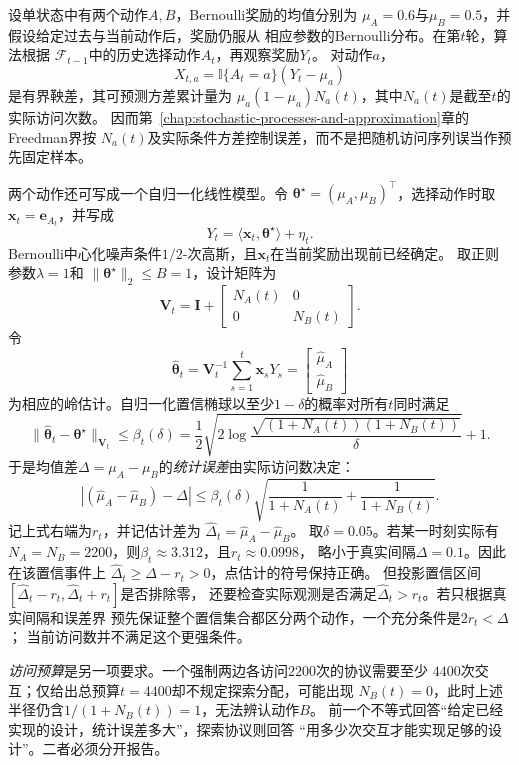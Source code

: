 \begin{example}[自适应两动作探索中的置信与访问预算]
  \label{ex:future-two-action-exploration-budget}
  设单状态中有两个动作\(A,B\)，Bernoulli奖励的均值分别为
  \(\mu_A=0.6\)与\(\mu_B=0.5\)，并假设给定过去与当前动作后，奖励仍服从
  相应参数的Bernoulli分布。在第\(t\)轮，算法根据
  \(\mathcal F_{t-1}\)中的历史选择动作\(A_t\)，再观察奖励\(Y_t\)。
  对动作\(a\)，
  \[
    X_{t,a}
    =
    \mathbb{I}\{A_t=a\}(Y_t-\mu_a)
  \]
  是有界鞅差，其可预测方差累计量为
  \(\mu_a(1-\mu_a)N_a(t)\)，其中\(N_a(t)\)是截至\(t\)的实际访问次数。
  因而第~\ref{chap:stochastic-processes-and-approximation}章的Freedman界按
  \(N_a(t)\)及实际条件方差控制误差，而不是把随机访问序列误当作预先固定样本。

  两个动作还可写成一个自归一化线性模型。令
  \(\bm\theta^\star=(\mu_A,\mu_B)^{\top}\)，选择动作时取
  \(\bm x_t=\bm e_{A_t}\)，并写成
  \[
    Y_t
    =
    \langle\bm x_t,\bm\theta^\star\rangle+\eta_t.
  \]
  Bernoulli中心化噪声条件\(1/2\)-次高斯，且\(\bm x_t\)在当前奖励出现前已经确定。
  取正则参数\(\lambda=1\)和
  \(\lVert\bm\theta^\star\rVert_2\leq B=1\)，设计矩阵为
  \[
    \bm V_t
    =
    \bm I+
    \begin{bmatrix}
      N_A(t)&0\\
      0&N_B(t)
    \end{bmatrix}.
  \]
  令
  \[
    \widehat{\bm\theta}_t
    =
    \bm V_t^{-1}
    \sum_{s=1}^{t}\bm x_sY_s
    =
    \begin{bmatrix}
      \widehat\mu_A\\
      \widehat\mu_B
    \end{bmatrix}
  \]
  为相应的岭估计。自归一化置信椭球以至少\(1-\delta\)的概率对所有\(t\)同时满足
  \[
    \lVert
      \widehat{\bm\theta}_t-\bm\theta^\star
    \rVert_{\bm V_t}
    \leq
    \beta_t(\delta)
    =
    \frac12
    \sqrt{
      2\log
      \frac{
        \sqrt{(1+N_A(t))(1+N_B(t))}
      }{\delta}
    }
    +1.
  \]
  于是均值差\(\Delta=\mu_A-\mu_B\)的\emph{统计误差}由实际访问数决定：
  \[
    \left|
      (\widehat\mu_A-\widehat\mu_B)-\Delta
    \right|
    \leq
    \beta_t(\delta)
    \sqrt{
      \frac{1}{1+N_A(t)}
      +
      \frac{1}{1+N_B(t)}
    }.
  \]
  记上式右端为\(r_t\)，并记估计差为
  \(\widehat\Delta_t=\widehat\mu_A-\widehat\mu_B\)。
  取\(\delta=0.05\)。若某一时刻实际有
  \(N_A=N_B=2200\)，则\(\beta_t\approx3.312\)，且\(r_t\approx0.0998\)，
  略小于真实间隔\(\Delta=0.1\)。因此在该置信事件上
  \(\widehat\Delta_t\geq\Delta-r_t>0\)，点估计的符号保持正确。
  但投影置信区间\([\widehat\Delta_t-r_t,\widehat\Delta_t+r_t]\)是否排除零，
  还要检查实际观测是否满足\(\widehat\Delta_t>r_t\)。若只根据真实间隔和误差界
  预先保证整个置信集合都区分两个动作，一个充分条件是\(2r_t<\Delta\)；
  当前访问数并不满足这个更强条件。

  \emph{访问预算}是另一项要求。一个强制两边各访问\(2200\)次的协议需要至少
  \(4400\)次交互；仅给出总预算\(t=4400\)却不规定探索分配，可能出现
  \(N_B(t)=0\)，此时上述半径仍含\(1/(1+N_B(t))=1\)，无法辨认动作\(B\)。
  前一个不等式回答“给定已经实现的设计，统计误差多大”，探索协议则回答
  “用多少次交互才能实现足够的设计”。二者必须分开报告。
\end{example}

